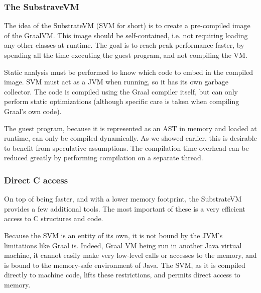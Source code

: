 \documentclass[twoside,11pt,a4paper]{article}
\begin{document}
\subsubsection{The SubstraveVM}

The idea of the SubstrateVM (SVM for short) is to create a pre-compiled image of the GraalVM. This image should be self-contained, i.e. not requiring loading any other classes at runtime. The goal is to reach peak performance faster, by spending all the time executing the guest program, and not compiling the VM.

Static analysis must be performed to know which code to embed in the compiled image. SVM must act as a JVM when running, so it has its own garbage collector. The code is compiled using the Graal compiler itself, but can only perform static optimizations (although specific care is taken when compiling Graal's own code).

The guest program, because it is represented as an AST in memory and loaded at runtime, can only be compiled dynamically. As we showed earlier, this is desirable to benefit from speculative assumptions. The compilation time overhead can be reduced greatly by performing compilation on a separate thread.


\subsubsection{Direct C access}

On top of being faster, and with a lower memory footprint, the SubstrateVM provides a few additional tools. The most important of these is a very efficient access to C structures and code.

Because the SVM is an entity of its own, it is not bound by the JVM's limitations like Graal is. Indeed, Graal VM being run in another Java virtual machine, it cannot easily make very low-level calls or accesses to the memory, and is bound to the memory-safe environment of Java. The SVM, as it is compiled directly to machine code, lifts these restrictions, and permits direct access to memory. 
\end{document}
